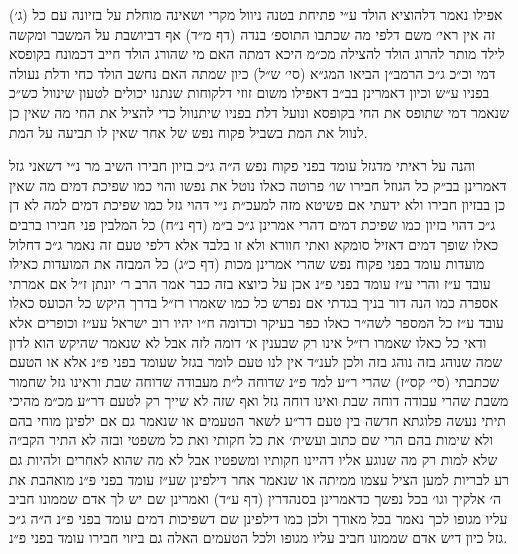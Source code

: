 \documentclass[12pt, openany]{book}
\begin{document}
\begin{multicols}{2}
(ג׳) אפילו נאמר דלהוציא הולד ע״י פתיחת בטנה ניוול מקרי ושאינה מוחלת על בזיונה עם כל זה אין ראי׳ משם דלפי מה שכתבו התוספ׳ בנדה (דף מ״ד) אף דביושבת על המשבר ומקשה לילד מותר להרוג הולד להצילה מכ״מ היכא דמתה האם מי שהורג הולד חייב דכמונח בקופסא דמי וכ״כ ג״כ הרמב״ן הביאו המג״א (סי׳ ש״ל) כיון שמתה האם נחשב הולד כחי ודלת נעולה בפניו ע״ש וכיון דאמרינן בב״ב דאפילו משום זוזי דלקוחות שנתנו יכולים לטעון שינוול כש״כ שנאמר דמי שתופס את החי בקופסא ונועל דלת בפניו שיתנוול כדי להציל את החי מה שאין כן לנוול את המת בשביל פקוח נפש של אחר שאין לו תביעה על המת.\\\vspace{0pt}

והנה על ראיתי מדגזל עומד בפני פקוח נפש ה״ה ג״כ בזיון חבירו השיב מר נ״י דשאני גזל דאמרינן בב״ק כל הגוזל חבירו שו׳ פרוטה כאלו נוטל את נפשו והוי כמו שפיכת דמים מה שאין כן בבזיון חבירו ולא ידעתי אם פשיטא מזה למעכ״ת נ״י דהוי גזל כמו שפיכת דמים למה לא דן ג״כ דהוי בזיון כמו שפיכת דמים דהרי אמרינן ג״כ ב״מ (דף נ״ח) כל המלבין פני חבירו ברבים כאלו שופך דמים דאזיל סומקא ואתי חוורא ולא זו בלבד אלא דלפי טעם זה נאמר ג״כ דחלול מועדות עומד בפני פקוח נפש שהרי אמרינן מכות (דף כ״ג) כל המבזה את המועדות כאילו עובד ע״ז והרי ע״ז עומד בפני פ״נ אכן על כיוצא בזה כבר אמר הרב ר׳ יונתן ז״ל אם אמרתי אספרה כמו הנה דור בניך בגדתי אם נפרש כל כמו שאמרו רז״ל בדרך היקש כל הכועס כאלו עובד ע״ז כל המספר לשה״ר כאלו כפר בעיקר וכדומה ח״ו יהיו רוב ישראל עע״ז וכופרים אלא ודאי כל כאלו שאמרו רז״ל אינו רק שבענין א׳ דומה לזה אבל לא שנאמר שהיקש הוא לדון שמה שנוהג בזה נוהג בזה ולכן לענ״ד אין לנו טעם לומר בגזל שעומד בפני פ״נ אלא או הטעם שכתבתי (סי׳ קס״ז) שהרי ר״ע למד פ״נ שדוחה ל״ת מעבודה שדוחה שבת וראינו גזל שחמור משבת שהרי עבודה דוחה שבת ואינו דוחה גזל ואף שזה לא שייך רק לטעם דר״ע מכ״מ מהיכי תיתי נעשה פלוגתא חדשה בין טעם דר״ע לשאר הטעמים או שנאמר גם אם ילפינן מוחי בהם ולא שימות בהם הרי שם כתוב ועשית׳ את כל חקותי ואת כל משפטי ובזה לא התיר הקב״ה שלא למות רק מה שנוגע אליו דהיינו חקותיו ומשפטיו אבל לא מה שהוא לאחרים ולהיות גם רע לבריות למען הציל עצמו ממיתה או שנאמר אחר דילפינן שע״ז עומד בפני פ״נ מואהבת את ה׳ אלקיך וגו׳ בכל נפשך כדאמרינן בסנהדרין (דף ע״ד) ואמרינן שם יש לך אדם שממונו חביב עליו מגופו לכך נאמר בכל מאודך ולכן כמו דילפינן שם דשפיכות דמים עומד בפני פ״נ ה״ה ג״כ גזל כיון דיש אדם שממונו חביב עליו מגופו ולכל הטעמים האלה גם ביזוי חבירו עומד בפני פ״נ.\\\vspace{0pt}


\end{multicols}
\end{document}
